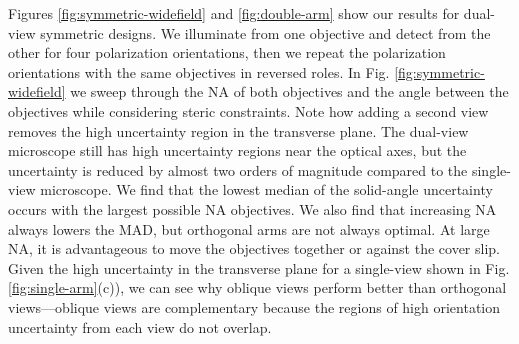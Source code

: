 \documentclass[10pt]{article}
\begin{document}
Figures \ref{fig:symmetric-widefield} and \ref{fig:double-arm} show our results
for dual-view symmetric designs. We illuminate from one objective and
detect from the other for four polarization orientations, then we repeat the
polarization orientations with the same objectives in reversed roles. In {\color{urlblue}Fig.}
\ref{fig:symmetric-widefield} we sweep through the NA of both objectives and the
angle between the objectives while considering steric constraints. Note how
adding a second view removes the high uncertainty region in the transverse
plane. The dual-view microscope still has high uncertainty regions near the
optical axes, but the uncertainty is reduced by almost two orders of magnitude
compared to the single-view microscope. We find that the lowest median of the
solid-angle uncertainty occurs with the largest possible NA objectives. We also
find that increasing NA always lowers the MAD, but orthogonal arms are not
always optimal. At large NA, it is advantageous to move the objectives together
or against the cover slip. Given the high uncertainty in the transverse plane
for a single-view shown in {\color{urlblue}Fig.} \ref{fig:single-arm}{\color{urlblue}(c)}), we can see why oblique
views perform better than orthogonal views---oblique views are complementary
because the regions of high orientation uncertainty from each view do not
overlap. 
\end{document}

